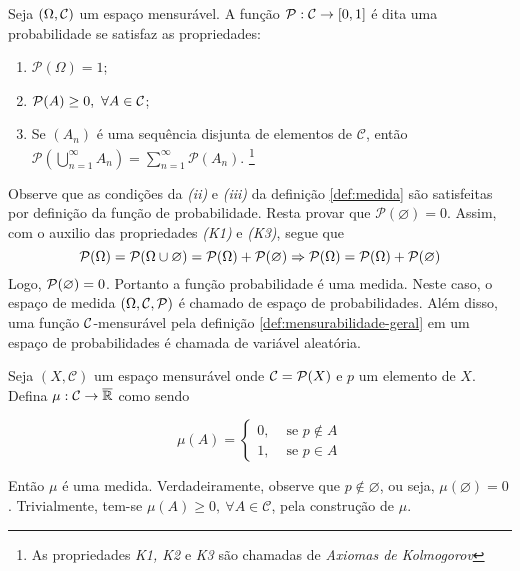 \begin{example}[Probabilidade]
	Seja $(\Omega, \operatorname{\mathcal{C}})$ um espaço mensurável.
	A função $\mathcal{P}:\operatorname{\mathcal{C}} \to [0,1]$ é dita uma probabilidade se satisfaz as propriedades:
	\begin{enumerate}[label* =(K\arabic*)]
		\item $\mathcal{P}(\Omega) = 1$;
		\item $\mathcal{P}(A) \geq 0,\ \forall A \in \operatorname{\mathcal{C}}$;
		\item Se $(A_n)$ é uma sequência disjunta de elementos de  $\mathcal{C}$, então 
		$\displaystyle\mathcal{P}\left(\bigcup_{n = 1}^\infty A_n\right) = \sum_{n = 1}^\infty\mathcal{P}(A_n)$.
		\footnote{As propriedades \textit{K1, K2} e \textit{K3} são chamadas de \textit{Axiomas de Kolmogorov}}
	\end{enumerate}
\end{example}

Observe que as condições da \textit{(ii)} e \textit{(iii)} da definição \ref{def:medida} são satisfeitas por definição da função de probabilidade.
Resta provar que $\mathcal{P}(\varnothing) = 0$.
Assim, com o auxilio das propriedades \textit{(K1)} e \textit{(K3)}, segue que 
$$
\operatorname{\mathcal{P}}(\Omega)
= 
\operatorname{\mathcal{P}}(\Omega \cup \varnothing)
= 
\operatorname{\mathcal{P}}(\Omega) + \operatorname{\mathcal{P}}(\varnothing)
\Rightarrow
\operatorname{\mathcal{P}}(\Omega)
= 
\operatorname{\mathcal{P}}(\Omega) + \operatorname{\mathcal{P}}(\varnothing)
$$
Logo, $\operatorname{\mathcal{P}}(\varnothing) = 0$. 
Portanto a função probabilidade é uma medida.
Neste caso, o espaço de medida $(\Omega, \operatorname{\mathcal{C}}, \operatorname{\mathcal{P}})$ é chamado de espaço de probabilidades.
Além disso, uma função $\operatorname{\mathcal{C}}$-mensurável pela definição \ref{def:mensurabilidade-geral} em um espaço de probabilidades é chamada de variável aleatória.

\begin{example}
\label{ex:medida-concentrada-em-p}
    Seja $(X, \mathcal{C})$ um espaço mensurável onde $\operatorname{\mathcal{C}} = \mathcal{P}(X)$ e $p$ um elemento de $X$.
    Defina $\mu: \mathcal{C} \to \operatorname{\overline{\mathbb{R}}}$  como sendo

$$\mu(A) = \left\{\begin{array}{cc}
0, & \textrm{\ se \ } p \notin A \\
1, & \textrm{\ se \ } p \in A 
\end{array}\right.$$


Então $\mu$ é uma medida.
Verdadeiramente, observe que $p \notin \varnothing$, ou seja, $\mu(\varnothing) = 0$.
Trivialmente, tem-se $\mu(A) \geq 0,\ \forall A \in \mathcal{C}$, pela construção de $\mu$.


\end{example}

